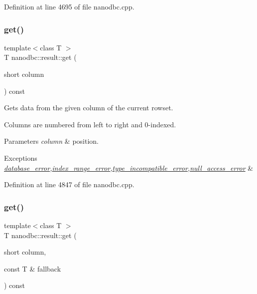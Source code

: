 Definition at line 4695 of file nanodbc.\+cpp.

\mbox{\label{classnanodbc_1_1result_affa949e32147a8f262d066a790651ad7}} 
\subsubsection{\texorpdfstring{get()}{get()}\hspace{0.1cm}{\footnotesize\ttfamily [1/4]}}
{\footnotesize\ttfamily template$<$class T $>$ \\
T nanodbc\+::result\+::get (\begin{DoxyParamCaption}\item[{short}]{column }\end{DoxyParamCaption}) const}



Gets data from the given column of the current rowset. 

Columns are numbered from left to right and 0-\/indexed. 
\begin{DoxyParams}{Parameters}
{\em column} & position. \\
\hline
\end{DoxyParams}

\begin{DoxyExceptions}{Exceptions}
{\em \mbox{\hyperlink{classnanodbc_1_1database__error}{database\+\_\+error}},\mbox{\hyperlink{classnanodbc_1_1index__range__error}{index\+\_\+range\+\_\+error}},\mbox{\hyperlink{classnanodbc_1_1type__incompatible__error}{type\+\_\+incompatible\+\_\+error}},\mbox{\hyperlink{classnanodbc_1_1null__access__error}{null\+\_\+access\+\_\+error}}} & \\
\hline
\end{DoxyExceptions}


Definition at line 4847 of file nanodbc.\+cpp.

\mbox{\label{classnanodbc_1_1result_af33ef788292fc12198c06924db24fe97}} 
\subsubsection{\texorpdfstring{get()}{get()}\hspace{0.1cm}{\footnotesize\ttfamily [2/4]}}
{\footnotesize\ttfamily template$<$class T $>$ \\
T nanodbc\+::result\+::get (\begin{DoxyParamCaption}\item[{short}]{column,  }\item[{const T \&}]{fallback }\end{DoxyParamCaption}) const}



